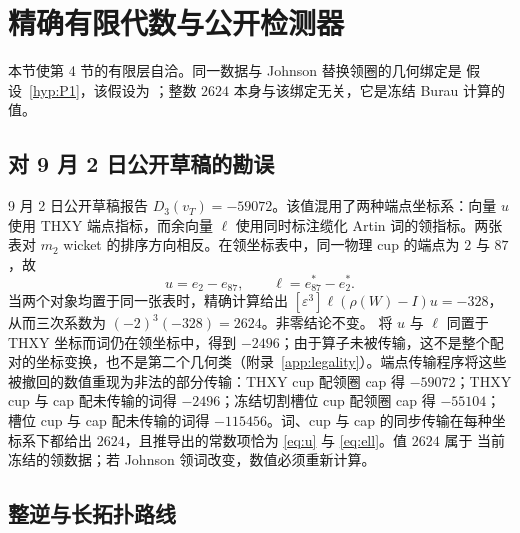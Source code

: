\section{精确有限代数与公开检测器}\label{sec:exact-algebra}

本节使第 4 节的有限层自洽。同一数据与 Johnson 替换领圈的几何绑定是
假设~\ref{hyp:P1}，该假设为 \Open；整数 $2624$ 本身与该绑定无关，它是冻结 Burau 计算的值。

\subsection{对 9 月 2 日公开草稿的勘误}

9 月 2 日公开草稿报告 $D_3(v_T)=-59072$。该值混用了两种端点坐标系：向量 $u$ 使用
THXY 端点指标，而余向量 $\ell$ 使用同时标注缆化 Artin 词的领指标。两张表对 $m_2$
wicket 的排序方向相反。在领坐标表中，同一物理 cup 的端点为 $2$ 与 $87$，故
\[
  u=e_2-e_{87},\qquad \ell=e_{87}^*-e_2^*.
\]
当两个对象均置于同一张表时，精确计算给出
$[\varepsilon^3]\ell(\rho(W)-I)u=-328$，从而三次系数为
$(-2)^3(-328)=2624$。非零结论不变。
将 $u$ 与 $\ell$ 同置于 THXY 坐标而词仍在领坐标中，得到 $-2496$；由于算子未被传输，这不是整个配对的坐标变换，也不是第二个几何类（附录~\ref{app:legality}）。端点传输程序将这些被撤回的数值重现为非法的部分传输：THXY cup 配领圈 cap 得 $-59072$；THXY cup 与 cap 配未传输的词得 $-2496$；冻结切割槽位 cup 配领圈 cap 得 $-55104$；槽位 cup 与 cap 配未传输的词得 $-115456$。词、cup 与 cap 的同步传输在每种坐标系下都给出 $2624$，且推导出的常数项恰为 \eqref{eq:u} 与 \eqref{eq:ell}。值 $2624$ 属于
当前冻结的领数据；若 Johnson 领词改变，数值必须重新计算。

\subsection{整逆与长拓扑路线}


